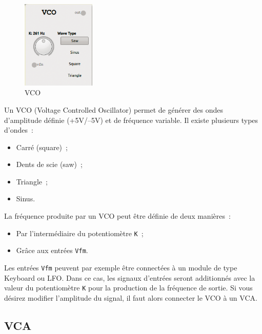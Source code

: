 \documentclass[a4paper,oneside,frenchb,10pt]{article}
\begin{document}
\begin{multicols}{2}
\begin{figure}[H]
\centering
\includegraphics[width=3.5cm]{../img/png/vco.png}
\caption{VCO}
\end{figure}

Un VCO (Voltage Controlled Oscillator) permet de générer des ondes
d'amplitude définie (+5V/--5V) et de fréquence variable. Il existe
plusieurs types d'ondes~:

\begin{itemize}
\item
  Carré (square)~;
\item
  Dents de scie (saw)~;
\item
  Triangle~;
\item
  Sinus.
\end{itemize}

La fréquence produite par un VCO peut être définie de deux manières~:

\begin{itemize}
\item
  Par l'intermédiaire du potentiomètre \verb!K!~;
\item
  Grâce aux entrées \verb!Vfm!.
\end{itemize}
\end{multicols}

Les entrées \verb!Vfm! peuvent par exemple être connectées à un module
de type Keyboard ou LFO. Dans ce cas, les signaux d'entrées seront
additionnés avec la valeur du potentiomètre \verb!K! pour la production
de la fréquence de sortie. Si vous désirez modifier l'amplitude du
signal, il faut alors connecter le VCO à un VCA.

\subsection{VCA}
\end{document}
